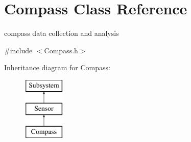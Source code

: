 \hypertarget{classCompass}{\section{Compass Class Reference}
\label{classCompass}
}


compass data collection and analysis  




{\ttfamily \#include $<$Compass.\-h$>$}

Inheritance diagram for Compass\-:\begin{figure}[H]
\begin{center}
\leavevmode
\includegraphics[height=3.000000cm]{classCompass}
\end{center}
\end{figure}
